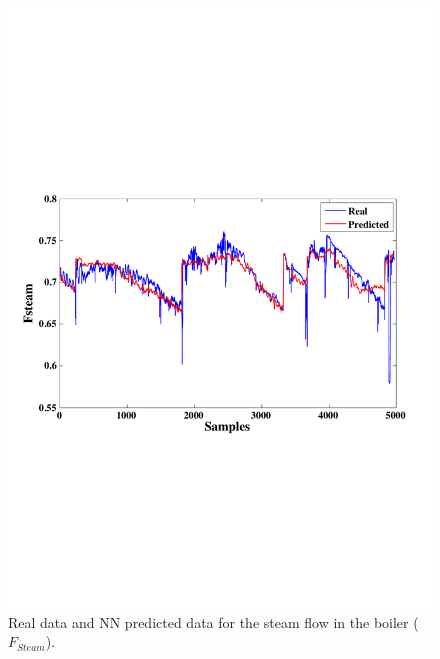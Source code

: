 \begin{figure}
\centering
\includegraphics[width=1\textwidth]{figures/ANN-EXHAUSTRECOVERY.pdf}
\caption{Real data and NN predicted data for the steam flow in the boiler ($F_{Steam}$).}
\label{Fboiler}
\end{figure}

